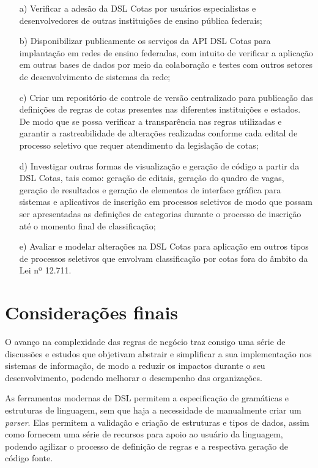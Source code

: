 \begin{enumerate}
    \item [a)] Verificar a adesão da DSL Cotas por usuários especialistas e desenvolvedores de outras instituições de ensino pública federais;
    \item [b)] Disponibilizar publicamente os serviços da API DSL Cotas para implantação em redes de ensino federadas, com intuito de verificar a aplicação em outras bases de dados por meio da colaboração e testes com outros setores de desenvolvimento de sistemas da rede; 
    \item [c)] Criar um repositório de controle de versão centralizado para publicação das definições de regras de cotas presentes nas diferentes instituições e estados. De modo que se possa verificar a transparência nas regras utilizadas e garantir a rastreabilidade de alterações realizadas conforme cada edital de processo seletivo que requer atendimento da legislação de cotas;
    \item [d)] Investigar outras formas de visualização e geração de código a partir da DSL Cotas, tais como: geração de editais, geração do quadro de vagas, geração de resultados e geração de elementos de interface gráfica para sistemas e aplicativos de inscrição em processos seletivos de modo que possam ser apresentadas as definições de categorias durante o processo de inscrição até o momento final de classificação;
    \item [e)] Avaliar e modelar alterações na DSL Cotas para aplicação em outros tipos de processos seletivos que envolvam classificação por cotas fora do âmbito da Lei nº 12.711.
\end{enumerate}

\section{Considerações finais}
\label{considfinal}

O avanço na complexidade das regras de negócio traz consigo uma série de discussões e estudos que objetivam abstrair e simplificar a sua implementação nos sistemas de informação, de modo a reduzir os impactos durante o seu desenvolvimento, podendo melhorar o desempenho das organizações.

As ferramentas modernas de \gls{DSL} permitem a especificação de gramáticas e estruturas de linguagem, sem que haja a necessidade de manualmente criar um \textit{parser}. Elas permitem a validação e criação de estruturas e tipos de dados, assim como fornecem uma série de recursos para apoio ao usuário da linguagem, podendo agilizar o processo de definição de regras e a respectiva geração de código fonte.

